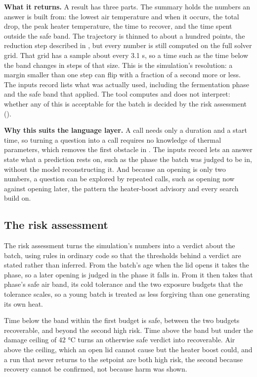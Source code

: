   \textbf{What it returns.} A result has three parts. The summary holds the numbers an answer is
  built from: the lowest air temperature and when it occurs, the total drop, the peak heater
  temperature, the time to recover, and the time spent outside the safe band. The trajectory is
  thinned to about a hundred points, the reduction step described in
  , but every number is still computed on the full solver grid. That grid has a sample about every
  3.1 s, so a time such as the time below the band changes in steps of that size. This is the
  simulation's resolution: a margin smaller than one step can flip with a fraction of a second
  more or less. The inputs record
  lists what was actually used, including the fermentation phase and the safe band that applied.
  The tool computes and does not interpret: whether any of this is acceptable for the batch is
  decided by the risk assessment ().

  \textbf{Why this suits the language layer.} A call needs only a duration and a start time, so
  turning a question into a call requires no knowledge of thermal parameters, which removes the
  first obstacle in . The inputs record lets an answer state what a prediction rests
  on, such as the phase the batch was judged to be in, without the model reconstructing it. And
  because an opening is only two numbers, a question can be explored by repeated calls, such as
  opening now against opening later, the pattern the heater-boost advisory and every search build
  on.

  \subsection{The risk assessment}
  \label{sec:analysis}

  The risk assessment turns the simulation's numbers into a verdict about the batch, using rules in
  ordinary code so that the thresholds behind a verdict are stated rather than inferred. From the
  batch's age when the lid opens it takes the phase, so a later opening is judged in the phase it
  falls in. From  it then takes that phase's safe air band,
  its cold tolerance and the two exposure budgets that the tolerance scales, so a young batch is
  treated as less forgiving than one generating its own heat.

  Time below the band within the first budget is safe, between the two budgets recoverable, and
  beyond the second high risk. Time above the band but under the damage ceiling of
  42 \si{\celsius} turns an otherwise safe verdict into recoverable. Air above the ceiling, which
  an open lid cannot cause but the heater boost could, and a run that never returns to the
  setpoint are both high risk, the second because recovery cannot be confirmed, not because harm
  was shown.

